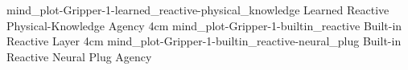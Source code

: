 {{                           {\dataappendixexperimenttwoprettyname}
                           \experimentcausegroupplotscontinued{\dataappendixexperimentthreeprettyname}
                                                              {mind_plot-Gripper-1-learned_reactive-physical_knowledge}
                                                              {Learned Reactive Physical-Knowledge Agency}
                                                              {\experimentdatacommontablereference}
                                                              {4cm}}
{\experimentcausegroupplots{\dataappendixmaxtime}
                           {\dataappendixexperimentonemaxtime}
                           {\dataappendixexperimenttwomaxtime}
                           {\dataappendixexperimentthreemaxtime}
                           {\dataappendixexperimentonename}
                           {\dataappendixexperimenttwoname}
                           {\dataappendixexperimentthreename}
                           {\dataappendixexperimentoneprettyname}
                           {\dataappendixexperimenttwoprettyname}
                           \experimentcausegroupplotscontinued{\dataappendixexperimentthreeprettyname}
                                                              {mind_plot-Gripper-1-builtin_reactive}
                                                              {Built-in Reactive Layer}
                                                              {\experimentdatacommontablereference}
                                                              {4cm}}
{\experimentcausegroupplots{\dataappendixmaxtime}
                           {\dataappendixexperimentonemaxtime}
                           {\dataappendixexperimenttwomaxtime}
                           {\dataappendixexperimentthreemaxtime}
                           {\dataappendixexperimentonename}
                           {\dataappendixexperimenttwoname}
                           {\dataappendixexperimentthreename}
                           {\dataappendixexperimentoneprettyname}
                           {\dataappendixexperimenttwoprettyname}
                           \experimentcausegroupplotscontinued{\dataappendixexperimentthreeprettyname}
                                                              {mind_plot-Gripper-1-builtin_reactive-neural_plug}
                                                              {Built-in Reactive Neural Plug Agency}
                                                              {\experimentdatacommontablereference}
}}
